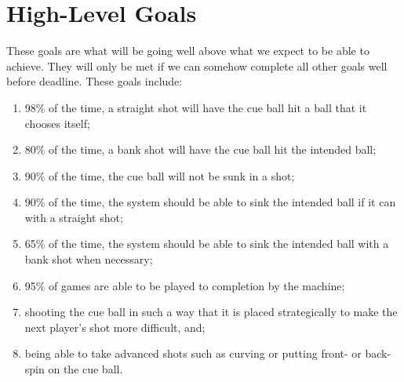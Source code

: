 \documentclass[titlepage]{article}
\begin{document}
\section{High-Level Goals}
These goals are what will be going well above what we expect to be able to achieve. They will only be met if we can somehow complete all other goals well before deadline. These goals include:
\begin{enumerate}
	\item 98\% of the time, a straight shot will have the cue ball hit a ball that it chooses itself;
	\item 80\% of the time, a bank shot will have the cue ball hit the intended ball;
	\item 90\% of the time, the cue ball will not be sunk in a shot;
	\item 90\% of the time, the system should be able to sink the intended ball if it can with a straight shot;
	\item 65\% of the time, the system should be able to sink the intended ball with a bank shot when necessary;
	\item 95\% of games are able to be played to completion by the machine;
	\item shooting the cue ball in such a way that it is placed strategically to make the next player's shot more difficult, and;
	\item being able to take advanced shots such as curving or putting front- or back-spin on the cue ball.
\end{enumerate}

\end{document}

